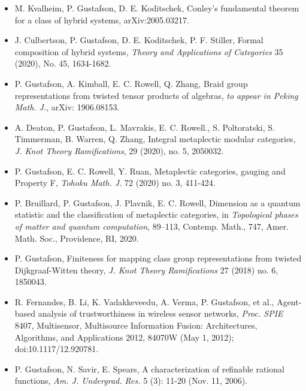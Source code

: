  \begin{itemize}

\item[] M. Kvalheim, P. Gustafson, D. E. Koditschek, {Conley's fundamental theorem for a class of hybrid systems}, arXiv:2005.03217.

\item[] J. Culbertson, P. Gustafson, D. E. Koditschek, P. F. Stiller, {Formal composition of hybrid systems}, \emph{Theory and Applications of Categories} {35} (2020), No. 45, 1634-1682.

  \item[] P. Gustafson, A. Kimball, E. C. Rowell, Q. Zhang, {Braid group representations from twisted tensor products of algebras}, \emph{to appear in Peking Math. J.}, arXiv: 1906.08153.

  \item[]  A. Deaton, P. Gustafson, L. Mavrakis, E. C. Rowell., S. Poltoratski, S. Timmerman, B. Warren, Q. Zhang, {Integral metaplectic modular categories}, \emph{J. Knot Theory Ramifications}, 29 (2020), no. 5, 2050032.
  
  \item[] P. Gustafson, E. C. Rowell, Y. Ruan, {Metaplectic categories, gauging and Property F}, \emph{Tohoku Math. J.} {72} (2020) no. 3, 411-424.

  \item[] P. Bruillard, P. Gustafson, J. Plavnik, E. C. Rowell, {Dimension as a quantum statistic and the classification of metaplectic categories}, in \emph{Topological phases of matter and quantum computation}, 89–113, Contemp. Math., 747, Amer. Math. Soc., Providence, RI, 2020.
    
  \item[] P. Gustafson, {Finiteness for mapping class group representations from twisted Dijkgraaf-Witten theory}, \emph{J. Knot Theory Ramifications} 27 (2018) no. 6, 1850043.

  \item[] R. Fernandes, B. Li, K. Vadakkeveedu, A. Verma, P. Gustafson, et al., {Agent-based analysis of trustworthiness in wireless sensor networks}, \emph{Proc. SPIE} {8407}, Multisensor, Multisource Information Fusion: Architectures, Algorithms, and Applications 2012, 84070W (May 1, 2012); doi:10.1117/12.920781. 

 \item[] P. Gustafson, N. Savir, E. Spears, {A characterization of refinable rational functions}, \emph{Am. J. Undergrad. Res.} {5} (3): 11-20 (Nov. 11, 2006).
  
 \end{itemize}
 
